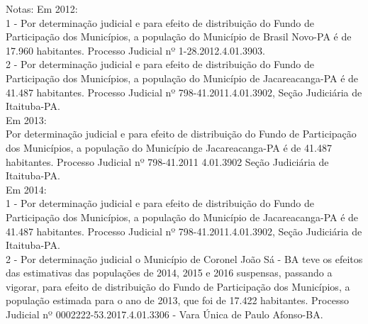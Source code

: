 \begin{flushright}
\begin{minipage}[b]{13.9cm}
\begin{SingleSpace}
\begin{footnotesize}
Notas: Em 2012: \\
\hspace*{0.9cm}
1 - Por determinação judicial e para efeito de distribuição do Fundo de Participação dos Municípios, a população do Município de Brasil Novo-PA é de 17.960 habitantes. Processo Judicial nº 1-28.2012.4.01.3903. \\
\hspace*{0.9cm} 2 - Por determinação judicial e para efeito de distribuição do Fundo de Participação dos Municípios, a população do Município de Jacareacanga-PA é de 41.487 habitantes. Processo Judicial nº 798-41.2011.4.01.3902, Seção Judiciária de Itaituba-PA. \\
\hspace*{0.9cm} Em 2013: \\
\hspace*{0.9cm} Por determinação judicial e para efeito de distribuição do Fundo de Participação dos Municípios, a população do Município de Jacareacanga-PA é de 41.487 habitantes. Processo Judicial nº 798-41.2011 4.01.3902 Seção Judiciária de Itaituba-PA. \\
\hspace*{0.9cm} Em 2014: \\
\hspace*{0.9cm}1 - Por determinação judicial e para efeito de distribuição do Fundo de Participação dos Municípios, a população do Município de Jacareacanga-PA é de 41.487 habitantes. Processo Judicial nº 798-41.2011.4.01.3902, Seção Judiciária de Itaituba-PA. \\
\hspace*{0.9cm} 2 - Por determinação judicial o Município de Coronel João Sá - BA teve os efeitos das estimativas das populações de 2014, 2015 e 2016 suspensas, passando a vigorar, para efeito de distribuição do Fundo de Participação dos Municípios, a população estimada para o ano de 2013, que foi de 17.422 habitantes. Processo Judicial nº 0002222-53.2017.4.01.3306 - Vara Única de Paulo Afonso-BA.
\end{footnotesize}
\end{SingleSpace}
\end{minipage}
\end{flushright}

\newpage

